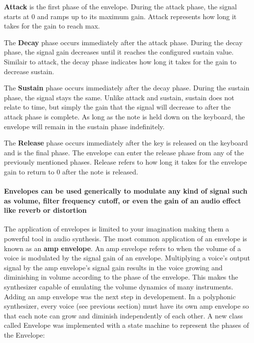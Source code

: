 \documentclass[acmlarge,screen]{acmart}
\begin{document}
	\textbf{Attack} is the first phase of the envelope. During the attack phase, the signal starts at 0 and ramps up to its maximum gain. Attack represents how long it takes for the gain to reach max.

	The \textbf{Decay} phase occurs immediately after the attack phase. During the decay phase, the signal gain decreases until it reaches the configured sustain value. Similair to attack, the decay phase indicates how long it takes for the gain to decrease sustain.

	The \textbf{Sustain} phase occurs immediately after the decay phase. During the sustain phase, the signal stays the same. Unlike attack and sustain, sustain does not relate to time, but simply the gain that the signal will decrease to after the attack phase is complete. As long as the note is held down on the keyboard, the envelope will remain in the sustain phase indefinitely.

	The \textbf{Release} phase occurs immediately after the key is released on the keyboard and is the final phase. The envelope can enter the release phase from any of the previously mentioned phases. Release refers to how long it takes for the envelope gain to return to 0 after the note is released. \cite{hass_2021}

	\paragraph{Envelopes can be used generically to modulate any kind of signal such as volume, filter frequency cutoff, or even the gain of an audio effect like reverb or distortion} The application of envelopes is limited to your imagination making them a powerful tool in audio synthesis. The most common application of an envelope is known as an \textbf{amp envelope}. An amp envelope refers to when the volume of a voice is modulated by the signal gain of an envelope. Multiplying a voice's output signal by the amp envelope's signal gain results in the voice growing and diminishing in volume according to the phase of the envelope. This makes the synthesizer capable of emulating the volume dynamics of many instruments. Adding an amp envelope was the next step in developement. In a polyphonic synthesizer, every voice (see previous section) must have its own amp envelope so that each note can grow and diminish independently of each other. A new class called Envelope was implemented with a state machine to represent the phases of the Envelope:
	
\end{document}
